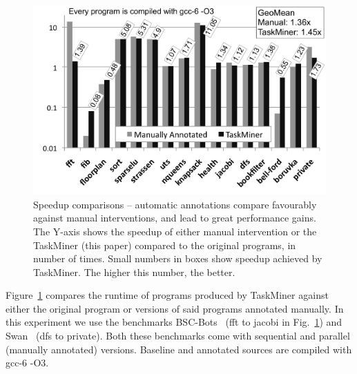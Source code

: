 \documentclass[sigplan,10pt,screen]{acmart}
\newcommand\Taskminer{\mbox{\textsf{TaskMiner}}}
\begin{document}
\begin{figure}[b!]
\begin{center}
\includegraphics[width=1\columnwidth]{images/TM_Performance}
\caption{Speedup comparisons -- automatic annotations compare favourably against
manual interventions, and lead to great performance gains.
The Y-axis shows the speedup of either manual intervention or the \Taskminer{}
(this paper) compared to the original programs, in number of times.
Small numbers in boxes show speedup achieved by \Taskminer.
The higher this number, the better.}
\label{fig:TM_Performance}
\end{center}
\end{figure}

Figure~\ref{fig:TM_Performance} compares the runtime of programs produced by
\Taskminer{} against either the original program
or versions of said programs annotated manually.
In this experiment we use the benchmarks \textsf{BSC-Bots}~\cite{Duran09} (\textsf{fft} to \textsf{jacobi}
in Fig.~\ref{fig:TM_Performance}) and \textsf{Swan}~\cite{Moreira17}
(\textsf{dfs} to \textsf{private}).
Both these benchmarks come with sequential and parallel (manually
annotated) versions.
Baseline and annotated sources are compiled with gcc-6 -O3.
\end{document}
